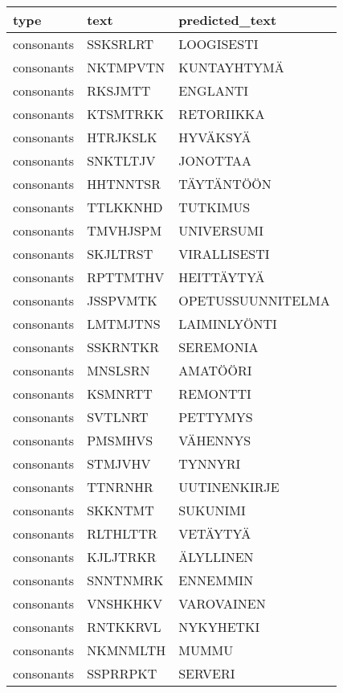 \begin{tabular}{lll}
\toprule
       type &      text &     predicted\_text \\
\midrule
 consonants &  SSKSRLRT &         LOOGISESTI \\
 consonants &  NKTMPVTN &        KUNTAYHTYMÄ \\
 consonants &   RKSJMTT &           ENGLANTI \\
 consonants &  KTSMTRKK &         RETORIIKKA \\
 consonants &  HTRJKSLK &           HYVÄKSYÄ \\
 consonants &  SNKTLTJV &           JONOTTAA \\
 consonants &  HHTNNTSR &         TÄYTÄNTÖÖN \\
 consonants &  TTLKKNHD &           TUTKIMUS \\
 consonants &  TMVHJSPM &         UNIVERSUMI \\
 consonants &  SKJLTRST &       VIRALLISESTI \\
 consonants &  RPTTMTHV &         HEITTÄYTYÄ \\
 consonants &  JSSPVMTK &  OPETUSSUUNNITELMA \\
 consonants &  LMTMJTNS &       LAIMINLYÖNTI \\
 consonants &  SSKRNTKR &          SEREMONIA \\
 consonants &   MNSLSRN &           AMATÖÖRI \\
 consonants &   KSMNRTT &           REMONTTI \\
 consonants &   SVTLNRT &           PETTYMYS \\
 consonants &   PMSMHVS &           VÄHENNYS \\
 consonants &   STMJVHV &            TYNNYRI \\
 consonants &   TTNRNHR &       UUTINENKIRJE \\
 consonants &   SKKNTMT &           SUKUNIMI \\
 consonants &  RLTHLTTR &           VETÄYTYÄ \\
 consonants &  KJLJTRKR &          ÄLYLLINEN \\
 consonants &  SNNTNMRK &           ENNEMMIN \\
 consonants &  VNSHKHKV &         VAROVAINEN \\
 consonants &  RNTKKRVL &          NYKYHETKI \\
 consonants &  NKMNMLTH &              MUMMU \\
 consonants &  SSPRRPKT &            SERVERI \\

\end{tabular}
